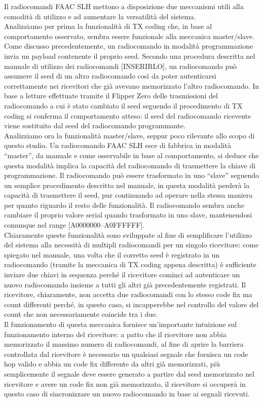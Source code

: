 Il radiocomandi FAAC SLH mettono a disposizione due meccanismi utili alla comodità di utilizzo e ad aumentare la versatilità del sistema.\\
Analizziamo per prima la funzionalità di TX coding che, in base al comportamento osservato, sembra essere funzionale alla meccanica master/slave. Come discusso precedentemente, un radiocomando in modalità programmazione invia un payload contenente il proprio seed. Secondo una procedura descritta nel manuale di utilizzo dei radiocomandi [INSERIRLO], un radiocomando può assumere il seed di un altro radiocomando così da poter autenticarsi correttamente nei ricevitori che già avevano memorizzato l’altro radiocomando. In base a letture effettuate tramite il Flipper Zero delle trasmissioni del radiocomando a cui è stato cambiato il seed seguendo il procedimento di TX coding si conferma il comportamento atteso: il seed del radiocomando ricevente viene sostituito dal seed del radiocomando programmante.\\
Analizziamo ora la funzionalità master/slave, seppur poco rilevante allo scopo di questo studio. Un radiocomando FAAC SLH esce di fabbrica in modalità “master”, da manuale \cite{man1} e come osservabile in base al comportamento, si deduce che questa modalità implica la capacità del radiocomando di trasmettere la chiave di programmazione. Il radiocomando può essere trasformato in uno “slave” seguendo un semplice procedimento descritto nel manuale, in questa modalità perderà la capacità di trasmettere il seed, pur continuando ad operare nella stessa maniera per quanto riguardo il resto delle funzionalità. Il radiocomando sembra anche cambiare il proprio valore serial quando trasformato in uno slave, mantenendosi comunque nel range [A0000000--A0FFFFFF].\\
Chiaramente queste funzionalità sono sviluppate al fine di semplificare l’utilizzo del sistema alla necessità di multipli radiocomandi per un singolo ricevitore: come spiegato nel manuale, una volta che il corretto seed è registrato in un radiocomando (tramite la meccanica di TX coding appena descritta) è sufficiente inviare due chiavi in sequenza perché il ricevitore cominci ad autenticare un nuovo radiocomando insieme a tutti gli altri già precedentemente registrati. Il ricevitore, chiaramente, non accetta due radiocomandi con lo stesso code fix ma count differenti perché, in questo caso, si incapperebbe nel controllo del valore del count che non necessariamente coincide tra i due.\\
Il funzionamento di questa meccanica fornisce un'importante intuizione sul funzionamento interno del ricevitore: a patto che il ricevitore non abbia memorizzato il massimo numero di radiocomandi, al fine di aprire la barriera controllata dal ricevitore è necessario un qualsiasi segnale che fornisca un code hop valido e abbia un code fix differente da altri già memorizzati, più semplicemente il segnale deve essere generato a partire dal seed memorizzato nel ricevitore e avere un code fix non già memorizzato, il ricevitore si occuperà in questo caso di sincronizzare un nuovo radiocomando in base ai segnali ricevuti.\\

